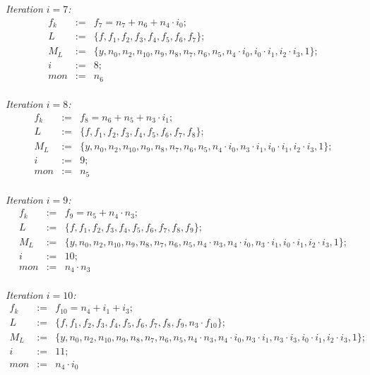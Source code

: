 \begin{Example}
	{\it Iteration $i=7$:}
	\begin{eqnarray}
		f_{k}&:=&f_{7}=n_7+n_6+n_4\cdot i_0; \nonumber \\
		L&:=&\{f,f_1,f_{2},f_{3},f_{4},f_{5},f_{6},f_{7}\}; \nonumber \\
		M_{L}&:=&\{ y,n_0,n_2,n_{10},n_9,n_8,n_7,n_6,n_5,n_4\cdot i_0,i_0\cdot i_1,i_2\cdot i_3,1\}; \nonumber \\
		i&:=&8;  \nonumber \\
		mon&:=& n_6\nonumber 
	\end{eqnarray}\\
	
	{\it Iteration $i=8$:}
	\begin{eqnarray}
		f_{k}&:=&f_{8}=n_6+n_5+n_3\cdot i_1; \nonumber \\
		L&:=&\{f,f_1,f_{2},f_{3},f_{4},f_{5},f_{6},f_{7},f_{8}\}; \nonumber \\
		M_{L}&:=&\{ y,n_0,n_2,n_{10},n_9,n_8,n_7,n_6,n_5,n_4\cdot i_0,n_3\cdot i_1,i_0\cdot i_1,i_2\cdot i_3,1\}; \nonumber \\
		i&:=&9;  \nonumber \\
		mon&:=& n_5\nonumber 
	\end{eqnarray}\\
	
	{\it Iteration $i=9$:}
	\begin{eqnarray}
		f_{k}&:=&f_{9}=n_5+n_4\cdot n_3; \nonumber \\
		L&:=&\{ f,f_1,f_{2},f_{3},f_{4},f_{5},f_{6},f_{7},f_{8},f_{9}\}; \nonumber \\
		M_{L}&:=&\{ y,n_0,n_2,n_{10},n_9,n_8,n_7,n_6,n_5,n_4\cdot n_3,n_4\cdot i_0,n_3\cdot i_1,i_0\cdot i_1,i_2\cdot i_3,1 \}; \nonumber \\
		i&:=&10;  \nonumber \\
		mon&:=& n_4\cdot n_3 \nonumber 
	\end{eqnarray}\\
	
	{\it Iteration $i=10$:}
	\begin{eqnarray}
		f_{k}&:=&f_{10}=n_4+i_1+i_3; \nonumber \\
		L&:=&\{ f,f_1,f_{2},f_{3},f_{4},f_{5},f_{6},f_{7},f_{8},f_{9},n_3 \cdot f_{10}\}; \nonumber \\
		M_{L}&:=&\{ y,n_0,n_2,n_{10},n_9,n_8,n_7,n_6,n_5,n_4\cdot n_3,n_4\cdot i_0,n_3\cdot i_1,n_3\cdot i_3,i_0\cdot i_1,i_2\cdot i_3,1 \}; \nonumber \\
		i&:=&11;  \nonumber \\
		mon&:=& n_4\cdot i_0\nonumber 
	\end{eqnarray}\\
	

\end{Example}

